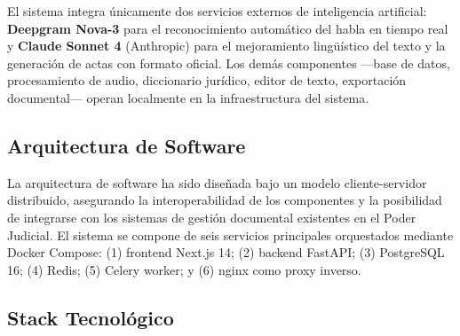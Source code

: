 \documentclass[12pt,a4paper,oneside]{report}
\begin{document}
El sistema integra únicamente dos servicios externos de inteligencia artificial: \textbf{Deepgram Nova-3} para el reconocimiento automático del habla en tiempo real y \textbf{Claude Sonnet 4} (Anthropic) para el mejoramiento lingüístico del texto y la generación de actas con formato oficial. Los demás componentes ---base de datos, procesamiento de audio, diccionario jurídico, editor de texto, exportación documental--- operan localmente en la infraestructura del sistema.

\subsection{Arquitectura de Software}

La arquitectura de software ha sido diseñada bajo un modelo cliente-servidor distribuido, asegurando la interoperabilidad de los componentes y la posibilidad de integrarse con los sistemas de gestión documental existentes en el Poder Judicial. El sistema se compone de seis servicios principales orquestados mediante Docker Compose: (1) frontend Next.js 14; (2) backend FastAPI; (3) PostgreSQL 16; (4) Redis; (5) Celery worker; y (6) nginx como proxy inverso.

\subsection{Stack Tecnológico}
\end{document}
